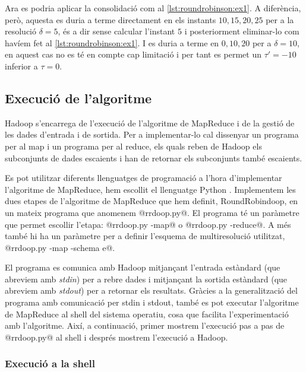 Ara es podria aplicar la consolidació com al
\autoref{lst:roundrobinson:ex1}. A diferència, però, aquesta es duria a terme
directament en els instants $10, 15, 20, 25$ per a la resolució
$\delta=5$, és a dir sense calcular l'instant $5$ i posteriorment
eliminar-lo com havíem fet al \autoref{lst:roundrobinson:ex1}. I es
duria a terme en $0, 10, 20$ per a $\delta=10$, en aquest cas no es té
en compte cap limitació i per tant es permet un $\tau'=-10$ inferior a
$\tau=0$.





\subsection{Execució de l'algoritme}


Hadoop s'encarrega de l'execució de l'algoritme de MapReduce i de la
gestió de les dades d'entrada i de sortida.  Per a implementar-lo cal
dissenyar un programa per al map i un programa per al reduce, els
quals reben de Hadoop els subconjunts de dades escaients i han de
retornar els subconjunts també escaients.  

Es pot utilitzar diferents llenguatges de programació a l'hora
d'implementar l'algoritme de MapReduce, hem escollit el llenguatge
Python \parencite{python:doc2}.  Implementem les dues etapes de
l'algoritme de MapReduce que hem definit, RoundRobindoop, en un mateix
programa que anomenem @rrdoop.py@. El programa té un paràmetre que
permet escollir l'etapa: @rrdoop.py -map@ o @rrdoop.py -reduce@. A més
també hi ha un paràmetre per a definir l'esquema de multiresolució
utilitzat, %
@rrdoop.py -map -schema e@.

El programa es comunica amb Hadoop mitjançant l'entrada estàndard (que
abreviem amb \emph{stdin}) per a rebre dades i mitjançant la sortida
estàndard (que abreviem amb \emph{stdout}) per a retornar els
resultats.  Gràcies a la generalització del programa amb comunicació
per stdin i stdout, també es pot executar l'algoritme de MapReduce al
shell del sistema operatiu, cosa que facilita l'experimentació amb
l'algoritme.  Així, a continuació, primer mostrem l'execució pas a pas
de @rrdoop.py@ al shell i després mostrem l'execució a Hadoop.



\subsubsection{Execució a la shell}

